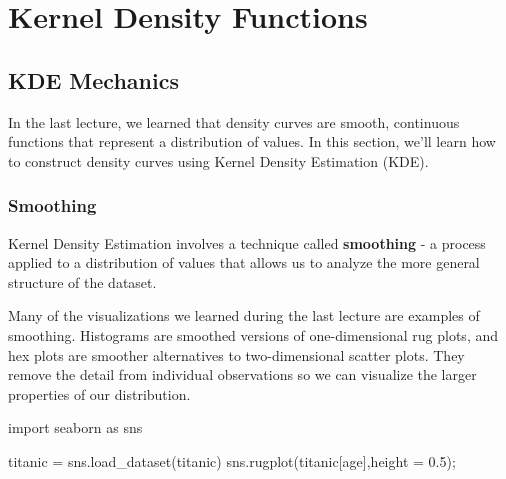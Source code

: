 \documentclass[
  letterpaper,
  DIV=11,
  numbers=noendperiod]{scrreprt}
\newenvironment{Shaded}{\begin{snugshade}}{\end{snugshade}}
\newcommand{\FloatTok}[1]{\textcolor[rgb]{0.68,0.00,0.00}{#1}}
\newcommand{\ImportTok}[1]{\textcolor[rgb]{0.00,0.46,0.62}{#1}}
\newcommand{\NormalTok}[1]{\textcolor[rgb]{0.00,0.23,0.31}{#1}}
\newcommand{\OperatorTok}[1]{\textcolor[rgb]{0.37,0.37,0.37}{#1}}
\newcommand{\StringTok}[1]{\textcolor[rgb]{0.13,0.47,0.30}{#1}}
\begin{document}
\hypertarget{kernel-density-functions}{%
\section{Kernel Density Functions}\label{kernel-density-functions}}

\hypertarget{kde-mechanics}{%
\subsection{KDE Mechanics}\label{kde-mechanics}}

In the last lecture, we learned that density curves are smooth,
continuous functions that represent a distribution of values. In this
section, we'll learn how to construct density curves using Kernel
Density Estimation (KDE).

\hypertarget{smoothing}{%
\subsubsection{Smoothing}\label{smoothing}}

Kernel Density Estimation involves a technique called \textbf{smoothing}
- a process applied to a distribution of values that allows us to
analyze the more general structure of the dataset.

Many of the visualizations we learned during the last lecture are
examples of smoothing. Histograms are smoothed versions of
one-dimensional rug plots, and hex plots are smoother alternatives to
two-dimensional scatter plots. They remove the detail from individual
observations so we can visualize the larger properties of our
distribution.

\begin{Shaded}
\begin{Highlighting}[]
\ImportTok{import}\NormalTok{ seaborn }\ImportTok{as}\NormalTok{ sns}

\NormalTok{titanic }\OperatorTok{=}\NormalTok{ sns.load\_dataset(}\StringTok{\textquotesingle{}titanic\textquotesingle{}}\NormalTok{)}
\NormalTok{sns.rugplot(titanic[}\StringTok{\textquotesingle{}age\textquotesingle{}}\NormalTok{],height }\OperatorTok{=} \FloatTok{0.5}\NormalTok{)}\OperatorTok{;}
\end{Highlighting}
\end{Shaded}
\end{document}
